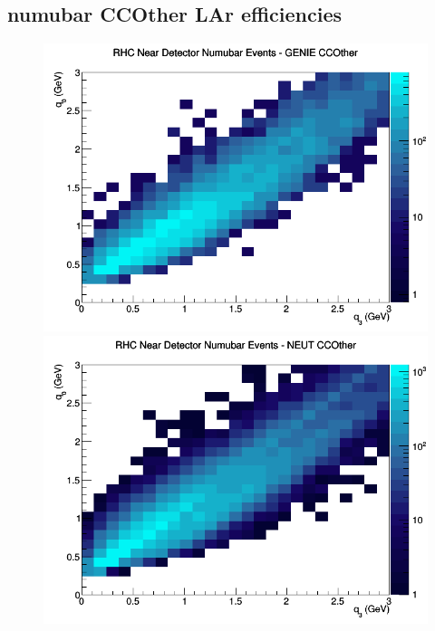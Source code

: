 \documentclass[12pt]{article}
\begin{document}
\subsection{numubar CCOther LAr efficiencies}
\begin{figure}[h]
\includegraphics[width=\linewidth]{eff_q0_q3/LAr/CCOther_RHC_ND_numubar_q3_q0_GENIE.png}
\endminipage
{}
\includegraphics[width=\linewidth]{eff_q0_q3/LAr/CCOther_RHC_ND_numubar_q3_q0_NEUT.png}
\endminipage
{}

\end{figure}
\end{document}
